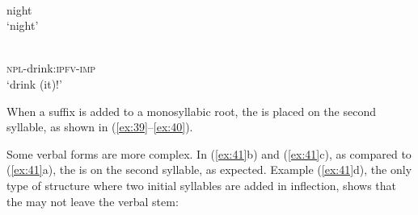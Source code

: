 \documentclass[output=paper]{langsci/langscibook}
\begin{document}
\ex \label{ex:37} %
\\
night\\
\glt `night'

\ex \label{ex:38} %
\\
\textsc{npl}-drink:\textsc{ipfv}-\textsc{imp}\\
\glt `drink (it)!'   
\z

When a suffix is added to a monosyllabic root, the  is placed on
the second syllable, as shown in (\ref{ex:39}–\ref{ex:40}).

\ea \label{ex:39}
\ea %
\exsameline %
\exsameline %
\z

\ex \label{ex:40} %
\ea {}%
\exsameline %
\exsameline %
\z
\z

Some verbal forms are more complex. In (\ref{ex:41}b) and (\ref{ex:41}c), as compared to
(\ref{ex:41}a), the  is on the second syllable, as expected. Example (\ref{ex:41}d),
the only type of structure where two initial syllables are added in
inflection, shows that the  may not leave the verbal stem:

\ea \label{ex:41} %
\ea {}%
\exsameline %
  
\end{document}

